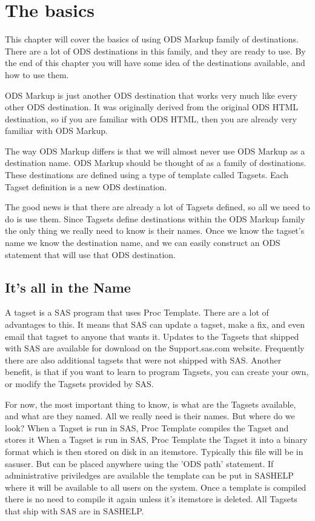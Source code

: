\chapter{The basics}
This chapter will cover the basics of using ODS Markup family of destinations.
There are a lot of ODS destinations in this family, and they are ready to
use.  By the end of this chapter you will have some idea of the destinations 
available, and how to use them.

ODS Markup is just another ODS destination that works very much
like every other ODS destination.  It was originally derived from
the original ODS HTML destination, so if you are familiar with ODS HTML,
then you are already very familiar with ODS Markup.

The way ODS Markup differs is that we will almost never use ODS Markup as
a destination name.  ODS Markup should be thought of as a family of destinations.
These destinations are defined using a type of template called Tagsets.  Each
Tagset definition is a new ODS destination.
 
The good news is that there are already a lot of Tagsets defined, so all we need
to do is use them.  Since Tagsets define destinations within the ODS Markup family
the only thing we really need to know is their names.  Once we know the tagset's 
name we know the destination name, and we can easily construct an ODS statement
that will use that ODS destination.



\section{It's all in the Name}
A tagset is a SAS program that uses Proc Template.  There are a lot of advantages to
this.  It means that SAS can update a tagset, make a fix, and even email that tagset
to anyone that wants it.  Updates to the Tagsets that shipped with SAS are available
for download on the Support.sas.com website.  Frequently there are also additional 
tagsets that were not shipped with SAS.  Another benefit, is that if you want to learn
to program Tagsets, you can create your own, or modify the Tagsets provided by SAS.

For now, the most important thing to know, is what are the Tagsets available, and 
what are they named.  All we really need is their names.  But where do we look?
When a Tagset is run in SAS, Proc Template compiles the Tagset and stores it
When a Tagset is run in SAS, Proc Template the Tagset
it into a binary format which is then stored on disk in an itemstore.
Typically this file will be in sasuser.  But can be placed anywhere
using the 'ODS path' statement.  If administrative priviledges are
available the template can be put in SASHELP where it will be
available to all users on the system.  Once a template is compiled
there is no need to compile it again unless it's itemstore is
deleted.  All Tagsets that ship with SAS are in SASHELP.

